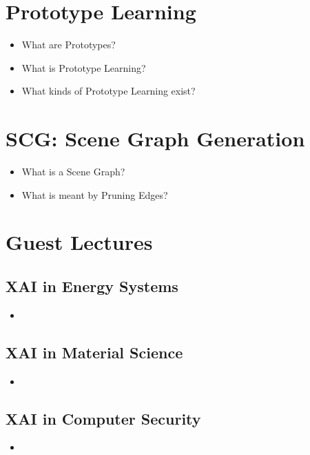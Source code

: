 \documentclass{report}
\begin{document}
	\section{Prototype Learning}
	
	\begin{itemize}
	\item What are Prototypes?
	\item What is Prototype Learning?
	\item What kinds of Prototype Learning exist?
	\end{itemize}
	
	\section{SCG: Scene Graph Generation}
	
	\begin{itemize}
	\item What is a Scene Graph?
	\item What is meant by Pruning Edges?
	\end{itemize}

	\section{Guest Lectures}
	
		\subsection{XAI in Energy Systems}
		
		\begin{itemize}
		\item 
		\end{itemize}
	
		\subsection{XAI in Material Science}
		
		\begin{itemize}
		\item 
		\end{itemize}
	
		\subsection{XAI in Computer Security}
		
		\begin{itemize}
		\item 
		\end{itemize}
	
\end{document}
